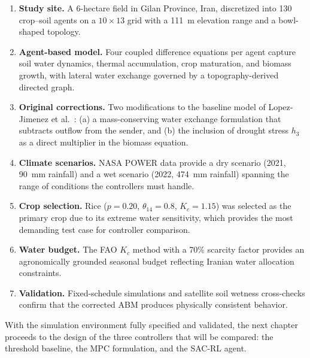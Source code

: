 \begin{enumerate}
    \item \textbf{Study site.} A 6-hectare field in Gilan Province, Iran, discretized into 130 crop--soil agents on a $10 \times 13$ grid with a 111~m elevation range and a bowl-shaped topology.
    
    \item \textbf{Agent-based model.} Four coupled difference equations per agent capture soil water dynamics, thermal accumulation, crop maturation, and biomass growth, with lateral water exchange governed by a topography-derived directed graph.
    
    \item \textbf{Original corrections.} Two modifications to the baseline model of Lopez-Jimenez et al.~\cite{Lopezjimenez2024}: (a) a mass-conserving water exchange formulation that subtracts outflow from the sender, and (b) the inclusion of drought stress $h_3$ as a direct multiplier in the biomass equation.
    
    \item \textbf{Climate scenarios.} NASA POWER data provide a dry scenario (2021, 90~mm rainfall) and a wet scenario (2022, 474~mm rainfall) spanning the range of conditions the controllers must handle.
    
    \item \textbf{Crop selection.} Rice ($p = 0.20$, $\theta_{14} = 0.8$, $K_c = 1.15$) was selected as the primary crop due to its extreme water sensitivity, which provides the most demanding test case for controller comparison.
    
    \item \textbf{Water budget.} The FAO $K_c$ method with a 70\% scarcity factor provides an agronomically grounded seasonal budget reflecting Iranian water allocation constraints.
    
    \item \textbf{Validation.} Fixed-schedule simulations and satellite soil wetness cross-checks confirm that the corrected ABM produces physically consistent behavior.
\end{enumerate}

With the simulation environment fully specified and validated, the next chapter proceeds to the design of the three controllers that will be compared: the threshold baseline, the MPC formulation, and the SAC-RL agent.